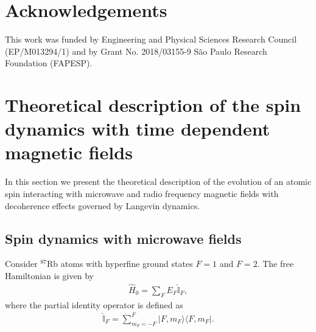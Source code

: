 \documentclass[%
reprint,
 amsmath,amssymb,
 aps,
floatfix,
]{revtex4-1}
\begin{document}
\section{Acknowledgements}
This work was funded by Engineering and Physical Sciences
Research Council (EP/M013294/1) and by  Grant  No.  2018/03155-9  S\~ao  Paulo  Research  Foundation
(FAPESP).

\appendix

\section{Theoretical description of the spin dynamics with time dependent magnetic fields \label{Sup:Dynamics} }
In this section we present the theoretical description of the evolution of an atomic spin interacting with microwave and radio frequency magnetic fields with decoherence effects governed by Langevin dynamics.

\subsection{Spin dynamics with microwave fields \label{Sup:MWDynamics} }
Consider $^{87}$Rb atoms with hyperfine ground states $F=1$ and $F=2$. The free Hamiltonian is given by
\begin{align}
\hat{H}_0=\sum_F E_F \hat{\mathbb{I}}_F,
\end{align}
where the partial identity operator is defined as 
\begin{align}
 \hat{\mathbb{I}}_F=\sum_{m_F=-F}^F |F, m_F\rangle \langle F, m_F|.
\end{align}
\end{document}
